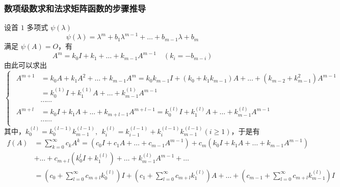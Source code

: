         \subsubsection{数项级数求和法求矩阵函数的步骤推导}
            \par 设首 $1$ 多项式 $\psi(\lambda)$
            \begin{equation*}
                \psi(\lambda) = \lambda^m + b_1\lambda^{m-1} + \dots + b_{m-1}\lambda + b_m
            \end{equation*}
            满足 $\psi(A) = O$，有
            \begin{equation*}
                A^m = k_0I + k_1 + \dots + k_{m-1}A^{m-1} \quad (k_i = -b_{m-i})
            \end{equation*}
            由此可以求出
            \begin{equation*}
                \begin{cases*}
                    \begin{aligned}
                        A^{m+1} &= k_0A + k_1A^2 + \dots + k_{m-1}A^{m} =  k_0k_{m-1}I + (k_0 + k_1k_{m-1})A + \dots + (k_{m-2} + k_{m-1}^2)A^{m-1} \\
                                &= k_0^{(1)}I + k_1^{(1)}A + \dots + k_{m-1}^{(1)}A^{m-1} \\
                        \qquad &\cdots \cdots \\ 
                        A^{m+l} &= k_0I + k_1A + \dots + k_{m+l-1}A^{m+l-1} =  k_0^{(l)}I + k_1^{(l)}A + \dots + k_{m-1}^{(l)}A^{m-1} \\
                        \qquad &\cdots \cdots
                    \end{aligned}
                \end{cases*} 
            \end{equation*}
            其中，$k_0^{(l)} = k_0^{(l-1)}k_{m-1}^{(l-1)}, \ \ k_i^{(l)} = k_{i-1}^{(l-1)} + k_i^{(l-1)}k_{m-1}^{(l-1)}(i \geq 1)$，于是有
            \begin{align*}
                f(A) &= \sum_{k=0}^{\infty}c_kA^k = (c_0I + c_1A + \dots + c_{m-1}A^{m-1}) + c_m(k_0I + k_1A + \dots + k_{m-1}A^{m-1}) \\ &+ \dots + c_{m+l}(k_0^{l}I + k_1^{(l)}) + \dots + k_{m-1}^{(l)}A^{m-1} + \dots \\ &= (c_0 + \sum_{l=0}^{\infty}c_{m+l}k_0^{(l)})I +  (c_1 + \sum_{l=0}^{\infty}c_{m+l}k_1^{(l)})A + \dots + (c_{m-1} + \sum_{l=0}^{\infty}c_{m+l}k_{m-1}^{(l)})I
            \end{align*}
